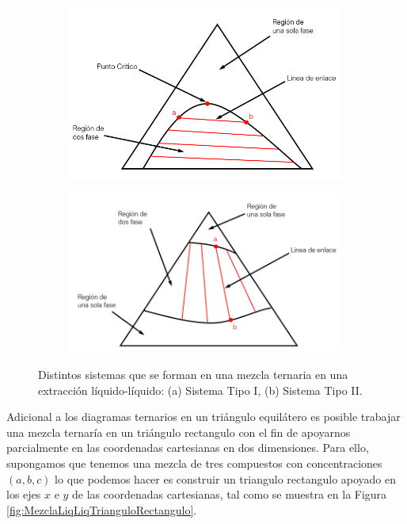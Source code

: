 \documentclass[11pt]{book}
\begin{document}
\begin{figure}[H]
  \begin{subfigure}[b]{0.45\textwidth}
    \centering
    \includegraphics[width=\textwidth]{img/LiquidoLiquido/DiagramaTriangular_Puntos.PNG}
    \caption{ }
    \label{fig:LiqLiqSistema_1}
  \end{subfigure}
  \hfill
  \begin{subfigure}[b]{0.50\textwidth}
    \centering
    \includegraphics[width=\textwidth]{img/LiquidoLiquido/DiagramaTriangular_Puntos_2.PNG}
    \caption{ }
    \label{fig:LiqLiqSistema_2}
  \end{subfigure}
  \caption{Distintos sistemas que se forman en una mezcla ternaria en una extracción líquido-líquido: (a) Sistema Tipo I, (b) Sistema Tipo II.}
  \label{fig:LiqLiqSistemas}
\end{figure}

Adicional a los diagramas ternarios en un triángulo equilátero es posible trabajar una mezcla ternaría en un triángulo rectangulo con el fin de apoyarnos parcialmente en las coordenadas cartesianas en dos dimensiones. Para ello,  supongamos que tenemos una mezcla de tres compuestos con concentraciones $(a,b,c)$ lo que podemos hacer es construir un triangulo rectangulo apoyado en los ejes $x$ e $y$ de las coordenadas cartesianas, tal como se muestra en la Figura \ref{fig:MezclaLiqLiqTrianguloRectangulo}.
\end{document}
